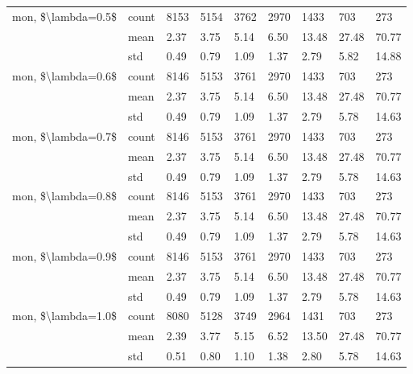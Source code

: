 \begin{tabular}{lllllllll}
mon, \$\textbackslash lambda=0.5\$ & count &   8153 &   5154 &    3762 &    2970 &     1433 &    703 &    273 \\
                   & mean &   2.37 &   3.75 &    5.14 &    6.50 &    13.48 &  27.48 &  70.77 \\
                   & std &   0.49 &   0.79 &    1.09 &    1.37 &     2.79 &   5.82 &  14.88 \\
mon, \$\textbackslash lambda=0.6\$ & count &   8146 &   5153 &    3761 &    2970 &     1433 &    703 &    273 \\
                   & mean &   2.37 &   3.75 &    5.14 &    6.50 &    13.48 &  27.48 &  70.77 \\
                   & std &   0.49 &   0.79 &    1.09 &    1.37 &     2.79 &   5.78 &  14.63 \\
mon, \$\textbackslash lambda=0.7\$ & count &   8146 &   5153 &    3761 &    2970 &     1433 &    703 &    273 \\
                   & mean &   2.37 &   3.75 &    5.14 &    6.50 &    13.48 &  27.48 &  70.77 \\
                   & std &   0.49 &   0.79 &    1.09 &    1.37 &     2.79 &   5.78 &  14.63 \\
mon, \$\textbackslash lambda=0.8\$ & count &   8146 &   5153 &    3761 &    2970 &     1433 &    703 &    273 \\
                   & mean &   2.37 &   3.75 &    5.14 &    6.50 &    13.48 &  27.48 &  70.77 \\
                   & std &   0.49 &   0.79 &    1.09 &    1.37 &     2.79 &   5.78 &  14.63 \\
mon, \$\textbackslash lambda=0.9\$ & count &   8146 &   5153 &    3761 &    2970 &     1433 &    703 &    273 \\
                   & mean &   2.37 &   3.75 &    5.14 &    6.50 &    13.48 &  27.48 &  70.77 \\
                   & std &   0.49 &   0.79 &    1.09 &    1.37 &     2.79 &   5.78 &  14.63 \\
mon, \$\textbackslash lambda=1.0\$ & count &   8080 &   5128 &    3749 &    2964 &     1431 &    703 &    273 \\
                   & mean &   2.39 &   3.77 &    5.15 &    6.52 &    13.50 &  27.48 &  70.77 \\
                   & std &   0.51 &   0.80 &    1.10 &    1.38 &     2.80 &   5.78 &  14.63 \\
\bottomrule
\end{tabular}
